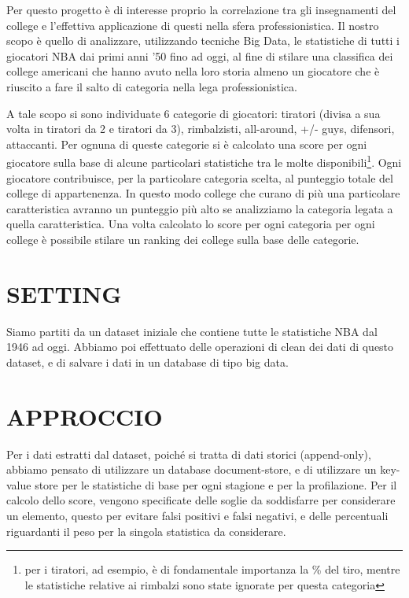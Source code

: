 \documentclass[10pt,a4paper,onecolumn]{article}
\begin{document}
Per questo progetto è di interesse proprio la correlazione tra gli insegnamenti del college e l'effettiva applicazione di questi nella sfera professionistica. Il nostro scopo è quello di analizzare, utilizzando tecniche Big Data, le statistiche di tutti i giocatori NBA dai primi anni '50 fino ad oggi, al fine di stilare una classifica dei college americani che hanno avuto nella loro storia almeno un giocatore che è riuscito a fare il salto di categoria nella lega professionistica.

A tale scopo si sono individuate 6 categorie di giocatori: tiratori (divisa a sua volta in tiratori da 2 e tiratori da 3), rimbalzisti, all-around, +/- guys, difensori, attaccanti. Per ognuna di queste categorie si è calcolato una score per ogni giocatore sulla base di alcune particolari statistiche tra le molte disponibili\footnote{per i tiratori, ad esempio, è di fondamentale importanza la \% del tiro, mentre le statistiche relative ai rimbalzi sono state ignorate per questa categoria}. Ogni giocatore contribuisce, per la particolare categoria scelta, al punteggio totale del college di appartenenza. In questo modo college che curano di più una particolare caratteristica avranno un punteggio più alto se analizziamo la categoria legata a quella caratteristica. Una volta calcolato lo score per ogni categoria per ogni college è possibile stilare un ranking dei college sulla base delle categorie.


\section{SETTING}

Siamo partiti da un dataset iniziale che contiene tutte le statistiche NBA dal 1946 ad oggi.\newline
Abbiamo poi effettuato delle operazioni di clean dei dati di questo dataset, e di salvare i dati in un database di tipo big data.

\section{APPROCCIO}

Per i dati estratti dal dataset, poiché si tratta di dati storici (append-only), abbiamo pensato di utilizzare un database document-store, e di utilizzare un key-value store per le statistiche di base per ogni stagione e per la profilazione.\newline
Per il calcolo dello score, vengono specificate delle soglie da soddisfarre per considerare un elemento, questo per evitare falsi positivi e falsi negativi, e delle percentuali riguardanti il peso per la singola statistica da considerare.
\end{document}
